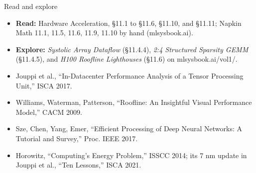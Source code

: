 \documentclass[aspectratio=169, 12pt]{beamer}
\begin{document}
\begin{frame}{Read and explore}
  \footnotesize
  \begin{itemize}\setlength{\itemsep}{0.06cm}
    \item \textbf{Read:} Hardware Acceleration, \S11.1 to \S11.6, \S11.10, and \S11.11; Napkin Math 11.1, 11.5, 11.6, 11.9, 11.10 by hand (mlsysbook.ai).
    \item \textbf{Explore:} \textit{Systolic Array Dataflow} (\S11.4.4), \textit{2:4 Structured Sparsity GEMM} (\S11.4.5), and \textit{H100 Roofline Lighthouses} (\S11.6) on mlsysbook.ai/vol1/.
    \item Jouppi et al., ``In-Datacenter Performance Analysis of a Tensor Processing Unit,'' ISCA 2017.
    \item Williams, Waterman, Patterson, ``Roofline: An Insightful Visual Performance Model,'' CACM 2009.
    \item Sze, Chen, Yang, Emer, ``Efficient Processing of Deep Neural Networks: A Tutorial and Survey,'' Proc. IEEE 2017.
    \item Horowitz, ``Computing's Energy Problem,'' ISSCC 2014; its 7 nm update in Jouppi et al., ``Ten Lessons,'' ISCA 2021.
  \end{itemize}
\end{frame}
\end{document}

